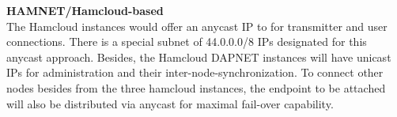 \textbf{HAMNET/Hamcloud-based}\\
The Hamcloud instances would offer an anycast IP to for transmitter and user connections. There is a special subnet of 44.0.0.0/8 IPs designated for this anycast approach. Besides, the Hamcloud DAPNET instances will have unicast IPs for administration and their inter-node-synchronization.
To connect other nodes besides from the three hamcloud instances, the endpoint to be attached will also be distributed via anycast for maximal fail-over capability.




